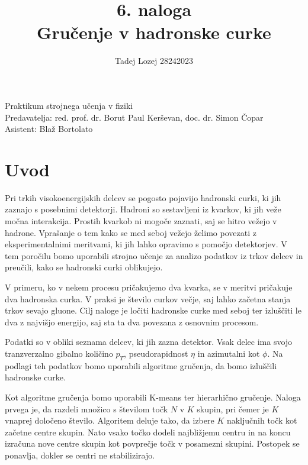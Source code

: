 \documentclass[slovene,11pt,a4paper]{article}
\begin{document}
\title{6. naloga \\ Gručenje v hadronske curke}
\author{Tadej Lozej 28242023}
\maketitle

\begin{center}
Praktikum strojnega učenja v fiziki \\
\bigskip
Predavatelja: red. prof. dr. Borut Paul Kerševan, doc. dr. Simon Čopar \\
Asistent: Blaž Bortolato
\end{center}

\newpage

\tableofcontents

\newpage


\section{Uvod}

Pri trkih visokoenergijskih delcev se pogosto pojavijo hadronski curki, ki jih zaznajo s posebnimi detektorji. Hadroni so sestavljeni iz kvarkov, ki jih veže močna interakcija. Prostih kvarkob ni mogoče zaznati, saj se hitro vežejo v hadrone. Vprašanje o tem kako se med seboj vežejo želimo povezati z eksperimentalnimi meritvami, ki jih lahko opravimo s pomočjo detektorjev. V tem poročilu bomo uporabili strojno učenje za analizo podatkov iz trkov delcev in preučili, kako se hadronski curki oblikujejo.

V primeru, ko v nekem procesu pričakujemo dva kvarka, se v meritvi pričakuje dva hadronska curka. V praksi je število curkov večje, saj lahko začetna stanja trkov sevajo gluone. Cilj naloge je ločiti hadronske curke med seboj ter izluščiti le dva z najvišjo energijo, saj sta ta dva povezana z osnovnim procesom.

Podatki so v obliki seznama delcev, ki jih zazna detektor. Vsak delec ima svojo tranzverzalno gibalno količino $p_T$, pseudorapidnost $\eta$ in azimutalni kot $\phi$. Na podlagi teh podatkov bomo uporabili algoritme gručenja, da bomo izluščili hadronske curke.

Kot algoritme gručenja bomo uporabili K-means ter hierarhično gručenje. Naloga prvega je, da razdeli množico s številom točk $N$ v $K$ skupin, pri čemer je $K$ vnaprej določeno število. Algoritem deluje tako, da izbere $K$ naključnih točk kot začetne centre skupin. Nato vsako točko dodeli najbližjemu centru in na koncu izračuna nove centre skupin kot povprečje točk v posamezni skupini. Postopek se ponavlja, dokler se centri ne stabilizirajo.
\end{document}
